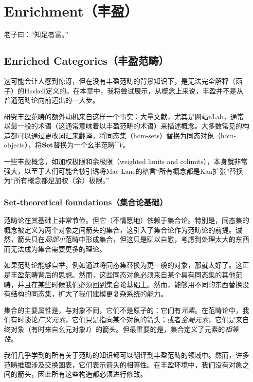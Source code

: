 \documentclass[DaoFP]{subfiles}
\begin{document}
 \setcounter{chapter}{19}

 \chapter{Enrichment（丰盈）}

 老子曰：“知足者富。”

 \section{Enriched Categories（丰盈范畴）}

 这可能会让人感到惊讶，但在没有丰盈范畴的背景知识下，是无法完全解释（函子）的Haskell定义的。在本章中，我将尝试展示，从概念上来说，丰盈并不是从普通范畴论向前迈出的一大步。

 研究丰盈范畴的额外动机来自这样一个事实：大量文献，尤其是网站nLab，通常以最一般的术语（这通常意味着以丰盈范畴的术语）来描述概念。大多数常见的构造都可以通过更改词汇来翻译，将同态集（hom-sets）替换为同态对象（hom-objects），将$\mathbf{Set}$替换为一个幺半范畴$\cat V$。

 一些丰盈概念，如加权极限和余极限（weighted limits and colimits），本身就非常强大，以至于人们可能会被引诱将Mac Lane的格言“所有概念都是Kan扩张”替换为“所有概念都是加权（余）极限。”

 \subsection{Set-theoretical foundations（集合论基础）}

 范畴论在其基础上非常节俭。但它（不情愿地）依赖于集合论。特别是，同态集的概念被定义为两个对象之间箭头的集合，这引入了集合论作为范畴论的前提。诚然，箭头只在\emph{局部小}范畴中形成集合，但这只是聊以自慰，考虑到处理太大的东西而无法成为集合需要更多的理论。

 如果范畴论能够自举，例如通过将同态集替换为更一般的对象，那就太好了。这正是丰盈范畴背后的思想。然而，这些同态对象必须来自某个具有同态集的其他范畴，并且在某些时候我们必须回到集合论基础上。然而，能够用不同的东西替换没有结构的同态集，扩大了我们建模更复杂系统的能力。

 集合的主要属性是，与对象不同，它们不是原子的：它们有\emph{元素}。在范畴论中，我们有时谈论\emph{广义元素}，它们只是指向某个对象的箭头；或者\emph{全局元素}，它们是来自终对象（有时来自幺元对象$I$）的箭头。但最重要的是，集合定义了元素的\emph{相等性}。

 我们几乎学到的所有关于范畴的知识都可以翻译到丰盈范畴的领域中。然而，许多范畴推理涉及交换图表，它们表示箭头的相等性。在丰盈环境中，我们没有对象之间的箭头，因此所有这些构造都必须进行修改。
\end{document}
